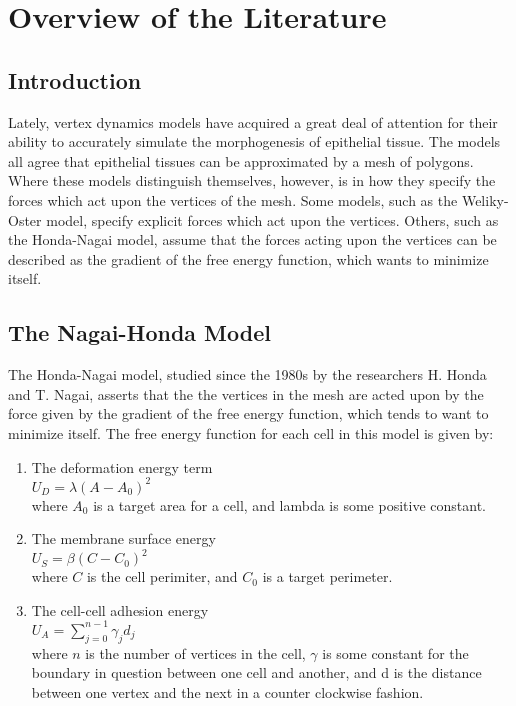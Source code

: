 \chapter{Overview of the Literature}
\section{Introduction}
Lately, vertex dynamics models have acquired a great deal of attention for their ability to accurately simulate the morphogenesis of epithelial tissue. The models all agree that epithelial tissues can be approximated by a mesh of polygons. Where these models distinguish themselves, however, is in how they specify the forces which act upon the vertices of the mesh. Some models, such as the Weliky-Oster model, specify explicit forces which act upon the vertices. Others, such as the Honda-Nagai model, assume that the forces acting upon the vertices can be described as the gradient of the free energy function, which wants to minimize itself.
\section{The Nagai-Honda Model}
The Honda-Nagai model, studied since the 1980s by the researchers H. Honda and T. Nagai, asserts that the the vertices in the mesh are acted upon by the force given by the gradient of the free energy function, which tends to want to minimize itself. The free energy function for each cell in this model is given by:
\begin{enumerate}
\item The deformation energy term \\ $U_D = \lambda(A - A_0)^2$ \\ where $A_0$ is a target area for a cell, and lambda is some positive constant.
\item The membrane surface energy \\ $U_S = \beta(C - C_0)^2$ \\ where $C$ is the cell perimiter, and $C_0$ is a target perimeter.
\item The cell-cell adhesion energy \\ $U_A = \displaystyle\sum\limits_{j = 0}^{n - 1}\gamma_{j}d_{j}$ \\ where $n$ is the number of vertices in the cell, $\gamma$ is some constant for the boundary in question between one cell and another, and d is the distance between one vertex and the next in a counter clockwise fashion. 
\end{enumerate}

